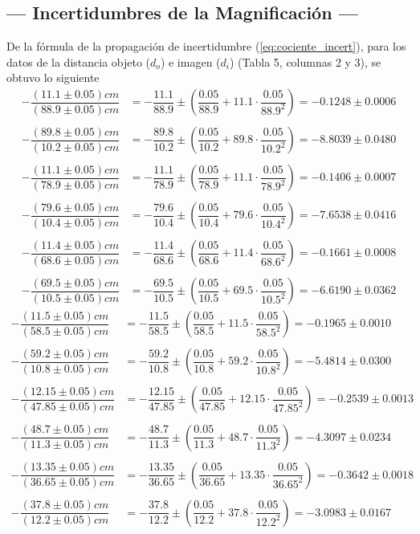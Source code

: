 \documentclass[10pt,a4paper]{article}
\begin{document}
\subsection{--- Incertidumbres de la Magnificación ---} %
\label{sub:incert_part_3}
	De la fórmula de la propagación de incertidumbre (\ref{eq:cociente_incert}), para los datos de la distancia objeto ($d_o$) e imagen ($d_i$) (Tabla 5, columnas 2 y 3), se obtuvo lo siguiente
	\begin{align*}
		-\dfrac{(11.1\pm 0.05)cm}{(88.9\pm 0.05)cm}&=-\dfrac{11.1}{88.9}\pm\left(\dfrac{0.05}{88.9}+11.1\cdot\dfrac{0.05}{88.9^2}\right)=-0.1248\pm0.0006\\\\
		-\dfrac{(89.8\pm 0.05)cm}{(10.2\pm 0.05)cm}&=-\dfrac{89.8}{10.2}\pm\left(\dfrac{0.05}{10.2}+89.8\cdot\dfrac{0.05}{10.2^2}\right)=-8.8039\pm0.0480\\\\
		-\dfrac{(11.1\pm 0.05)cm}{(78.9\pm 0.05)cm}&=-\dfrac{11.1}{78.9}\pm\left(\dfrac{0.05}{78.9}+11.1\cdot\dfrac{0.05}{78.9^2}\right)=-0.1406\pm0.0007\\\\
		-\dfrac{(79.6\pm 0.05)cm}{(10.4\pm 0.05)cm}&=-\dfrac{79.6}{10.4}\pm\left(\dfrac{0.05}{10.4}+79.6\cdot\dfrac{0.05}{10.4^2}\right)=-7.6538\pm0.0416\\\\
		-\dfrac{(11.4\pm 0.05)cm}{(68.6\pm 0.05)cm}&=-\dfrac{11.4}{68.6}\pm\left(\dfrac{0.05}{68.6}+11.4\cdot\dfrac{0.05}{68.6^2}\right)=-0.1661\pm0.0008\\\\
		-\dfrac{(69.5\pm 0.05)cm}{(10.5\pm 0.05)cm}&=-\dfrac{69.5}{10.5}\pm\left(\dfrac{0.05}{10.5}+69.5\cdot\dfrac{0.05}{10.5^2}\right)=-6.6190\pm0.0362
	\end{align*}
	\begin{align*}
		-\dfrac{(11.5\pm 0.05)cm}{(58.5\pm 0.05)cm}&=-\dfrac{11.5}{58.5}\pm\left(\dfrac{0.05}{58.5}+11.5\cdot\dfrac{0.05}{58.5^2}\right)=-0.1965\pm0.0010\\\\
		-\dfrac{(59.2\pm 0.05)cm}{(10.8\pm 0.05)cm}&=-\dfrac{59.2}{10.8}\pm\left(\dfrac{0.05}{10.8}+59.2\cdot\dfrac{0.05}{10.8^2}\right)=-5.4814\pm0.0300\\\\
		-\dfrac{(12.15\pm 0.05)cm}{(47.85\pm 0.05)cm}&=-\dfrac{12.15}{47.85}\pm\left(\dfrac{0.05}{47.85}+12.15\cdot\dfrac{0.05}{47.85^2}\right)=-0.2539\pm0.0013\\\\
		-\dfrac{(48.7\pm 0.05)cm}{(11.3\pm 0.05)cm}&=-\dfrac{48.7}{11.3}\pm\left(\dfrac{0.05}{11.3}+48.7\cdot\dfrac{0.05}{11.3^2}\right)=-4.3097\pm 0.0234\\\\
		-\dfrac{(13.35\pm 0.05)cm}{(36.65\pm 0.05)cm}&=-\dfrac{13.35}{36.65}\pm\left(\dfrac{0.05}{36.65}+13.35\cdot\dfrac{0.05}{36.65^2}\right)=-0.3642\pm0.0018\\\\
		-\dfrac{(37.8\pm 0.05)cm}{(12.2\pm 0.05)cm}&=-\dfrac{37.8}{12.2}\pm\left(\dfrac{0.05}{12.2}+37.8\cdot\dfrac{0.05}{12.2^2}\right)=-3.0983\pm0.0167
	\end{align*}
\end{document}

